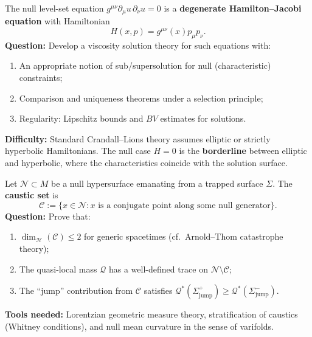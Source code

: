 \begin{openproblem}
\label{op:viscosity-null}
The null level-set equation $g^{\mu\nu}\partial_\mu u \, \partial_\nu u = 0$ is a \textbf{degenerate Hamilton--Jacobi equation} with Hamiltonian
$$H(x, p) = g^{\mu\nu}(x) p_\mu p_\nu.$$
\textbf{Question:} Develop a viscosity solution theory for such equations with:
\begin{enumerate}[label=(\roman*)]
\item An appropriate notion of sub/supersolution for null (characteristic) constraints;
\item Comparison and uniqueness theorems under a selection principle;
\item Regularity: Lipschitz bounds and $BV$ estimates for solutions.
\end{enumerate}
\textbf{Difficulty:} Standard Crandall--Lions theory assumes elliptic or strictly hyperbolic Hamiltonians. The null case $H = 0$ is the \textbf{borderline} between elliptic and hyperbolic, where the characteristics coincide with the solution surface.
\end{openproblem}

\begin{openproblem}
\label{op:caustic-measure}
Let $\mathcal{N} \subset M$ be a null hypersurface emanating from a trapped surface $\Sigma$. The \textbf{caustic set} is
$$\mathcal{C} := \{x \in \mathcal{N} : x \text{ is a conjugate point along some null generator}\}.$$
\textbf{Question:} Prove that:
\begin{enumerate}[label=(\roman*)]
\item $\dim_{\mathcal{H}}(\mathcal{C}) \leq 2$ for generic spacetimes (cf.\ Arnold--Thom catastrophe theory);
\item The quasi-local mass $\mathcal{Q}$ has a well-defined trace on $\mathcal{N} \setminus \mathcal{C}$;
\item The ``jump'' contribution from $\mathcal{C}$ satisfies $\mathcal{Q}^*(\Sigma^+_{\text{jump}}) \geq \mathcal{Q}^*(\Sigma^-_{\text{jump}})$.
\end{enumerate}
\textbf{Tools needed:} Lorentzian geometric measure theory, stratification of caustics (Whitney conditions), and null mean curvature in the sense of varifolds.
\end{openproblem}

